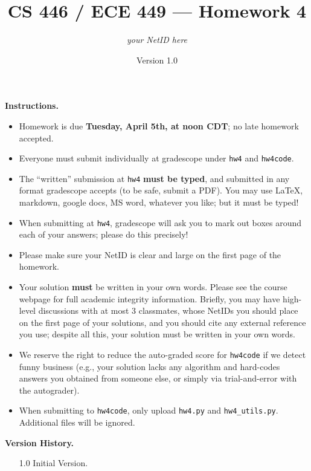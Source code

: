 \documentclass{article}
\title{CS 446 / ECE 449 --- Homework 4}
\author{\emph{your NetID here}}
\date{Version 1.0}
\theoremstyle{definition}
\theoremstyle{remark}
\begin{document}
        \maketitle

        \noindent\textbf{Instructions.}
        \begin{itemize}
          \item
            Homework is due \textbf{Tuesday, April 5th, at noon CDT}; no late homework accepted.
        
          \item
            Everyone must submit individually at gradescope under \texttt{hw4} and \texttt{hw4code}.
        
          \item
            The ``written'' submission at \texttt{hw4} \textbf{must be typed}, and submitted in
            any format gradescope accepts (to be safe, submit a PDF).  You may use \LaTeX, markdown,
            google docs, MS word, whatever you like; but it must be typed!
        
          \item
            When submitting at \texttt{hw4}, gradescope will ask you to mark out boxes
            around each of your answers; please do this precisely!
        
          \item
            Please make sure your NetID is clear and large on the first page of the homework.
        
          \item
            Your solution \textbf{must} be written in your own words.
            Please see the course webpage for full academic integrity information.
            Briefly, you may have high-level discussions with at most 3 classmates,
            whose NetIDs you should place on the first page of your solutions,
            and you should cite any external reference you use; despite all this,
            your solution must be written in your own words.
        
          \item
            We reserve the right to reduce the auto-graded score for
            \texttt{hw4code} if we detect funny business (e.g., your solution
            lacks any algorithm and hard-codes answers you obtained from
            someone else, or simply via trial-and-error with the autograder).
            
          \item
           When submitting to \texttt{hw4code}, only upload \texttt{hw4.py} and \texttt{hw4\_utils.py}. Additional files will be ignored.
        
        \end{itemize}
        \noindent\textbf{Version History.}
        \begin{enumerate}[leftmargin=3\parindent]
        	\item[1.0]
        	Initial Version. 
	\end{enumerate}
       
\end{document}
